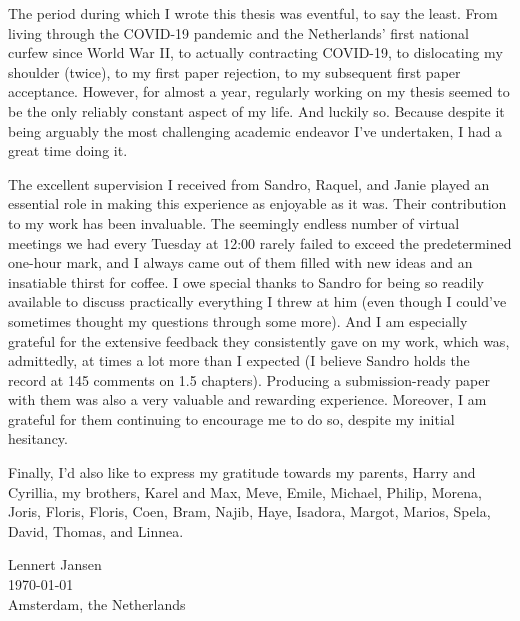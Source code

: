 The period during which I wrote this thesis was eventful, to say the least.
From living through the COVID-19 pandemic and the Netherlands' first national curfew since World War II,
to actually contracting COVID-19,
to dislocating my shoulder (twice), to my first paper rejection, to my subsequent first paper acceptance.
However, for almost a year, regularly working on my thesis seemed to be the only reliably constant aspect of my life.
And luckily so. 
Because despite it being arguably the most challenging academic endeavor I've undertaken, I had a great time doing it.

The excellent supervision I received from Sandro, Raquel, and Janie played an essential role in making this experience as enjoyable as it was.
Their contribution to my work has been invaluable.
The seemingly endless number of virtual meetings we had every Tuesday at 12:00 rarely failed to exceed the predetermined one-hour mark, and I always came out of them filled with new ideas and an insatiable thirst for coffee.
I owe special thanks to Sandro for being so readily available to discuss practically everything I threw at him (even though I could've sometimes thought my questions through some more). 
And I am especially grateful for the extensive feedback they consistently gave on my work, which was, admittedly, at times a lot more than I expected (I believe Sandro holds the record at 145 comments on 1.5 chapters).
Producing a submission-ready paper with them was also a very valuable and rewarding experience.
Moreover, I am grateful for them continuing to encourage me to do so, despite my initial hesitancy.

Finally, I'd also like to express my gratitude towards my parents, Harry and Cyrillia, my brothers, Karel and Max, Meve, Emile, Michael, Philip, Morena, Joris, Floris, Floris, Coen, Bram, Najib, Haye, Isadora, Margot, Marios, Spela, David, Thomas, and Linnea.



\begin{flushright}
    Lennert Jansen \\
    \noindent \today \\
    \noindent Amsterdam, the Netherlands
\end{flushright}